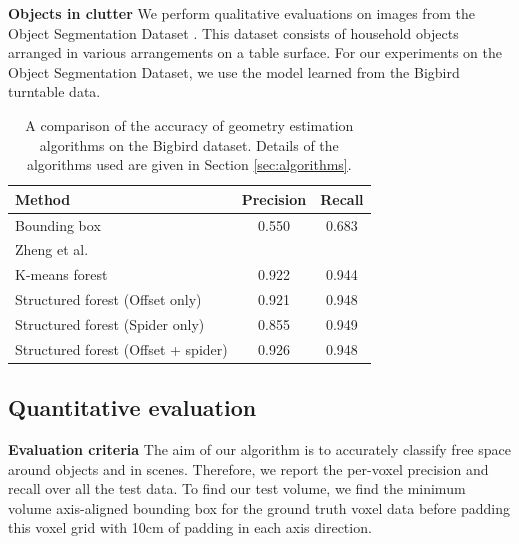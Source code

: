 \documentclass[10pt,twocolumn,letterpaper]{article}
\makeatletter
\newcommand*{\ea}{et al.\@\xspace}
\renewcommand{\paragraph}{\vspace{2pt}\noindent\textbf}
\makeatother
\begin{document}

\paragraph{Objects in clutter}
We perform qualitative evaluations on images from the Object Segmentation Dataset \cite{richtsfeld-iros-2012}.
This dataset consists of household objects arranged in various arrangements on a table surface.
For our experiments on the Object Segmentation Dataset, we use the model learned from the Bigbird turntable data.



\begin{table}
  \centering
  \begin{tabular}{p{4.8cm}cc}
  \toprule
  \textbf{Method}  &   \textbf{Precision} & \textbf{Recall} \\
  \midrule
  Bounding box & 0.550 & 0.683  \\
  Zheng \ea \cite{zheng-cvpr-2013}  &  &  \\
  K-means forest & 0.922 & 0.944 \\
  Structured forest (Offset only) & 0.921 & 0.948 \\
  Structured forest (Spider only) &  0.855 & 0.949 \\
  Structured forest (Offset + spider) & 0.926 & 0.948 \\
  \bottomrule
  \end{tabular}
  \vspace{5pt}
  \caption{A comparison of the accuracy of geometry estimation algorithms on the Bigbird dataset. Details of the algorithms used are given in Section \ref{sec:algorithms}.}
    \label{tab:quant_results}
\end{table}


\subsection{Quantitative evaluation}

\paragraph{Evaluation criteria}
The aim of our algorithm is to accurately classify free space around objects and in scenes.
Therefore, we report the per-voxel precision and recall over all the test data.
To find our test volume, we find the minimum volume axis-aligned bounding box for the ground truth voxel data before padding this voxel grid with 10cm of padding in each axis direction.
\end{document}
